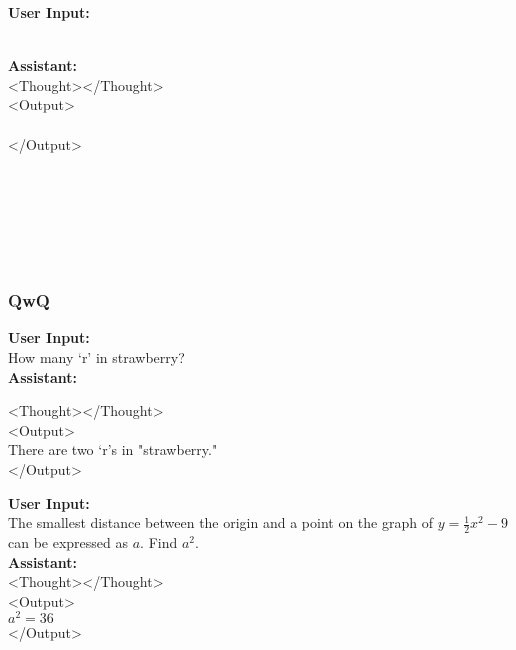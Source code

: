 \begin{abox} 
\textbf{User Input:}  \\
 \\
\end{abox}
\begin{abox}
\textbf{Assistant:}\\
<Thought></Thought>\\
<Output>\\
\\
</Output>
\end{abox}


\ \\
\ \\
\ \\
\ \\
\ \\

\clearpage

\subsubsection{QwQ}

\begin{abox} 
\textbf{User Input:}\\
How many `r' in strawberry? \\


\textbf{Assistant:}

<Thought></Thought>\\
<Output>\\
There are two `r's in "strawberry."\\
</Output>
\end{abox}


\begin{abox} 
\textbf{User Input:}  \\
The smallest distance between the origin and a point on the graph of $y=\frac{1}{2}x^2-9$ can be expressed as $a$.  Find $a^2$. \\

\textbf{Assistant:}\\
<Thought></Thought>\\
<Output>\\
$ a^2 = 36 $\\
</Output>

\end{abox}

